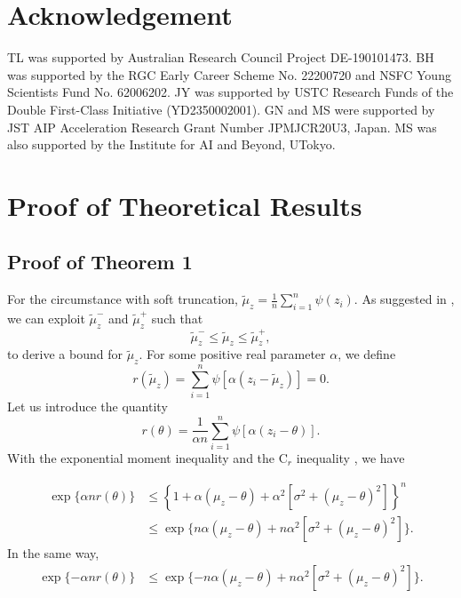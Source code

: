 \documentclass[11pt]{article}
\begin{document}
\section*{Acknowledgement}
TL was supported by Australian Research Council Project DE-190101473. BH was supported by the RGC Early Career Scheme No. 22200720 and NSFC Young Scientists Fund No. 62006202. JY was supported by USTC Research Funds of the Double First-Class Initiative (YD2350002001). GN and MS were supported by JST AIP Acceleration Research Grant Number JPMJCR20U3, Japan. MS was also supported by the Institute for AI and Beyond, UTokyo.

\appendix

\section{Proof of Theoretical Results}
\subsection{Proof of Theorem 1}
For the circumstance with soft truncation, $\tilde{\mu}_z=\frac{1}{n}\sum_{i=1}^n\psi(z_i)$. As suggested in \cite{catoni2012challenging}, we can exploit $\tilde{\mu}^{-}_z$ and $\tilde{\mu}^{+}_z$ such that 
\begin{equation}
    \tilde{\mu}^{-}_z\leq\tilde{\mu}_z\leq\tilde{\mu}^{+}_z, 
\end{equation}
to derive a bound for $\tilde{\mu}_z$. For some positive real parameter $\alpha$, we define 
\begin{equation}
    r(\tilde{\mu}_z)=\sum_{i=1}^n\psi\left[\alpha(z_i-\tilde{\mu}_z)\right]=0.
\end{equation}
Let us introduce the quantity
\begin{equation}
    r(\theta)=\frac{1}{\alpha n}\sum_{i=1}^n\psi\left[\alpha(z_i-\theta)\right].
\end{equation}
With the exponential moment inequality \cite{gine2000exponential} and the $\text{C}_r$ inequality \cite{mohri2018foundations}, we have 

\begin{equation}
\begin{aligned}
   \exp\{\alpha nr(\theta)\}&\leq\left\{1+\alpha(\mu_z-\theta)+\alpha^2[\sigma^2+(\mu_z-\theta)^2]\right\}^n\\
   &\leq\exp\{n\alpha(\mu_z-\theta)+n\alpha^2[\sigma^2+(\mu_z-\theta)^2]\}.
\end{aligned}
\end{equation}
In the same way,
\begin{equation}
\begin{aligned}
   \exp\{-\alpha nr(\theta)\}&\leq\exp\{-n\alpha(\mu_z-\theta)+n\alpha^2[\sigma^2+(\mu_z-\theta)^2]\}.
\end{aligned}
\end{equation}
\end{document}
